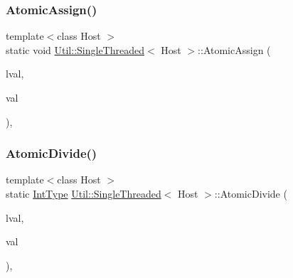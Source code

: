 \mbox{\label{classUtil_1_1SingleThreaded_a013f12cfed48924a184b58e9d614dc6a}} 
\subsubsection{\texorpdfstring{AtomicAssign()}{AtomicAssign()}\hspace{0.1cm}{\footnotesize\ttfamily [6/6]}}
{\footnotesize\ttfamily template$<$class Host $>$ \\
static void \mbox{\hyperlink{classUtil_1_1SingleThreaded}{Util\+::\+Single\+Threaded}}$<$ Host $>$\+::Atomic\+Assign (\begin{DoxyParamCaption}\item[{\mbox{\hyperlink{classUtil_1_1SingleThreaded_a35932213fb0c15a7b67ced79bc2af4c6}{Int\+Type}} \&}]{lval,  }\item[{volatile \mbox{\hyperlink{classUtil_1_1SingleThreaded_a35932213fb0c15a7b67ced79bc2af4c6}{Int\+Type}} \&}]{val }\end{DoxyParamCaption})\hspace{0.3cm}{\ttfamily [inline]}, {\ttfamily [static]}}

\mbox{\label{classUtil_1_1SingleThreaded_ab6c6cc9b62833f2a6e9f52aac7243a74}} 
\subsubsection{\texorpdfstring{AtomicDivide()}{AtomicDivide()}\hspace{0.1cm}{\footnotesize\ttfamily [1/6]}}
{\footnotesize\ttfamily template$<$class Host $>$ \\
static \mbox{\hyperlink{classUtil_1_1SingleThreaded_a35932213fb0c15a7b67ced79bc2af4c6}{Int\+Type}} \mbox{\hyperlink{classUtil_1_1SingleThreaded}{Util\+::\+Single\+Threaded}}$<$ Host $>$\+::Atomic\+Divide (\begin{DoxyParamCaption}\item[{volatile \mbox{\hyperlink{classUtil_1_1SingleThreaded_a35932213fb0c15a7b67ced79bc2af4c6}{Int\+Type}} \&}]{lval,  }\item[{\mbox{\hyperlink{classUtil_1_1SingleThreaded_a35932213fb0c15a7b67ced79bc2af4c6}{Int\+Type}}}]{val }\end{DoxyParamCaption})\hspace{0.3cm}{\ttfamily [inline]}, {\ttfamily [static]}}

